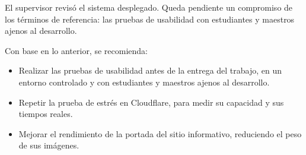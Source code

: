 El supervisor revisó el sistema desplegado. Queda pendiente un compromiso de los términos de referencia: las pruebas de usabilidad con estudiantes y maestros ajenos al desarrollo.

Con base en lo anterior, se recomienda:

\begin{itemize}
    \item Realizar las pruebas de usabilidad antes de la entrega del trabajo, en un entorno controlado y con estudiantes y maestros ajenos al desarrollo.
    \item Repetir la prueba de estrés en Cloudflare, para medir su capacidad y sus tiempos reales.
    \item Mejorar el rendimiento de la portada del sitio informativo, reduciendo el peso de sus imágenes.
\end{itemize}

